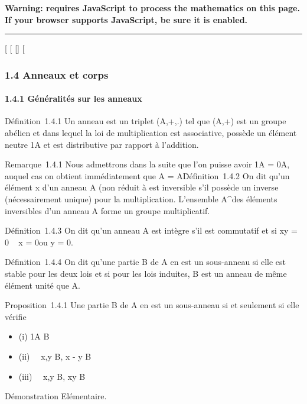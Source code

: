 \textbf{Warning: 
requires JavaScript to process the mathematics on this page.\\ If your
browser supports JavaScript, be sure it is enabled.}

\begin{center}\rule{3in}{0.4pt}\end{center}

{[}
{[}
{[}{]}
{[}

\subsubsection{1.4 Anneaux et corps}

\paragraph{1.4.1 Généralités sur les anneaux}

Définition~1.4.1 Un anneau est un triplet (A,+,.) tel que (A,+) est un
groupe abélien et dans lequel la loi de multiplication est associative,
possède un élément neutre 1A et est distributive par rapport à
l'addition.

Remarque~1.4.1 Nous admettrons dans la suite que l'on puisse avoir
1A = 0A, auquel cas on obtient immédiatement que A =
\0A\.

Définition~1.4.2 On dit qu'un élément x d'un anneau A (non réduit à
\0\) est inversible s'il possède un
inverse (nécessairement unique) pour la multiplication. L'ensemble
A^\times des éléments inversibles d'un anneau A forme un groupe
multiplicatif.

Définition~1.4.3 On dit qu'un anneau A est intègre s'il est commutatif
et si xy = 0 \rigtharrow~ x = 0\text ou y = 0.

Définition~1.4.4 On dit qu'une partie B de A en est un sous-anneau si
elle est stable pour les deux lois et si pour les lois induites, B est
un anneau de même élément unité que A.

Proposition~1.4.1 Une partie B de A en est un sous-anneau si et
seulement si elle vérifie

\begin{itemize}
\itemsep1pt\parskip0pt
\item
  (i) 1A \in B
\item
  (ii) \forall~~x,y \in B, x - y \in B
\item
  (iii) \forall~~x,y \in B, xy \in B
\end{itemize}

Démonstration Elémentaire.

